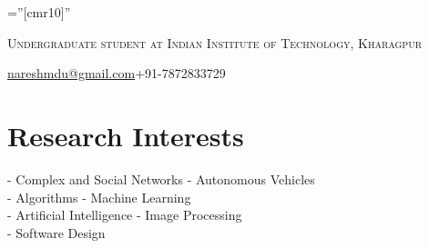 \documentclass[a4paper,10pt]{article} %
\begin{document}
\pagestyle{empty} %

\font\fb=''[cmr10]'' %


\par{\bigskip\par} %
\par{\centering\large {\textsc{Undergraduate student at Indian Institute of Technology, Kharagpur}}\par}\large
\hspace{2cm}\normalsize {\href{mailto:nareshmdu@gmail.com}{nareshmdu@gmail.com}}\hfill{+91-7872833729}\hspace{2cm}

%


\section{Research Interests}

- Complex and Social Networks\hfill
- Autonomous Vehicles\hspace{3cm} \\
- Algorithms\hfill
- Machine Learning\hspace{3.6cm} \\
- Artificial Intelligence\hfill
- Image Processing\hspace{3.7cm} \\
- Software Design
\end{document}
